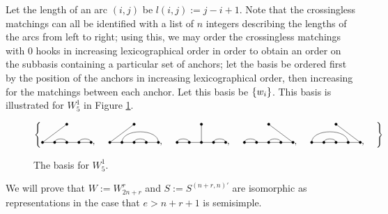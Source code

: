 \documentclass{amsart}
\begin{document}
Let the length of an arc $(i,j)$ be $l(i,j) := j - i + 1$.
Note that the crossingless matchings can all be identified with a list of $n$ integers describing the lengths of the arcs from left to right;
using this, we may order the crossingless matchings with 0 hooks in increasing lexicographical order in order to obtain an order on the subbasis containing a particular set of anchors;
let the basis be ordered first by the position of the anchors in increasing lexicographical order, then increasing for the matchings between each anchor.
Let this basis be $\left\{ w_i \right\}$.
This basis is illustrated for $W_{5}^1$ in Figure \ref{S5 Basis}. 

\begin{figure}
  \def\cbasisspacing{5mm}
  $\cbr{
    \begin{gathered}
      \GeneralizedMatching{5}{2/3, 4/5}{1}{1/1}{3/4}, \hspace{\cbasisspacing}
      \GeneralizedMatching{5}{2/5, 3/4}{1}{1/1}{3/4}, \hspace{\cbasisspacing}
      \GeneralizedMatching{5}{1/2, 4/5}{1}{3/1}{3/4}, \hspace{\cbasisspacing}
      \GeneralizedMatching{5}{1/2, 3/4}{1}{5/1}{3/4}, \hspace{\cbasisspacing}
      \GeneralizedMatching{5}{1/4, 2/3}{1}{5/1}{3/4}, \hspace{\cbasisspacing}
     \end{gathered}}$ 
    \caption{The basis for $W_5^1$.}
  \label{S5 Basis}
\end{figure} 

We will prove that $W := W_{2n+r}^r$ and $S := S^{(n+r,n)'}$ are isomorphic as representations in the case that $e > n + r + 1$ is semisimple.

\newpage 
\end{document}
